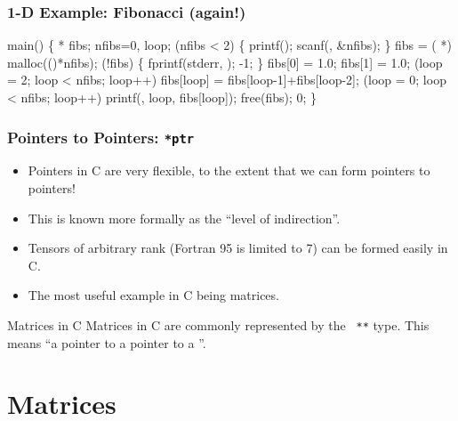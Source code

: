 \documentclass[smaller,handout,table]{beamer}
\begin{document}
\begin{frame}[fragile]
\frametitle{1-D Example: Fibonacci (again!)}
\begin{semiverbatim}
\tiny
\kr\kl{} 
\kl{} 
\kl
\kl{} main()
\kl\{
\kl   {} * fibs;
\kl   {} nfibs=0, loop;
\kl   {} (nfibs < 2)
\kl   \{
\kl      printf();
\kl      scanf(, \&nfibs);
\kl   \}
\kl   
\kl   fibs = ( *) malloc(()*nfibs);
\kl   {} (!fibs) 
\kl   \{
\kl      fprintf(stderr, );
\kl      {} -1;
\kl   \}       
\kl   
\kl   fibs[0] = 1.0; fibs[1] = 1.0;
\kl   {} (loop = 2; loop < nfibs; loop++)
\kl      fibs[loop] = fibs[loop-1]+fibs[loop-2];
\kl      
\kl   {} (loop = 0; loop < nfibs; loop++)
\kl      printf(, loop, fibs[loop]);
\kl      
\kl   free(fibs);
\kl   {} 0;
\kl\}
\end{semiverbatim}
\end{frame}

\begin{frame}
\frametitle{Pointers to Pointers: {\tt **ptr}}
\begin{itemize}
\item Pointers in C are very flexible, to the extent that we can form pointers to pointers!
\item This is known more formally as the ``level of indirection''.
\item Tensors of arbitrary rank (Fortran 95 is limited to 7) can be formed easily in C.
\item The most useful example in C being matrices.
\end{itemize}
\begin{block}{Matrices in C}
Matrices in C are commonly represented by the {\tt {} **} type. This means ``a pointer to a pointer to a {\tt {}}''.
\end{block}
\end{frame}


\section{Matrices}
\end{document}
